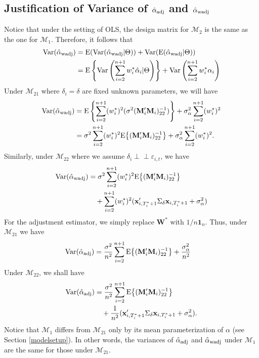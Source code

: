 \documentclass[11pt,3p,review,authoryear]{elsarticle}
\def\mbf#1{\mathbf{#1}} %
\newcommand{\indep}{\perp \!\!\! \perp } %
\def\mrm#1{\mathrm{#1}} %
\def\mc#1{\mathcal{#1}} %
\def\E#1{\mathrm{E}(#1)} %
\def\var#1{\mathrm{Var}(#1)} %
\theoremstyle{definition}
\begin{document}
\subsection{Justification of Variance of $\hat{\alpha}_{\rm adj}$ and $\hat{\alpha}_{\rm wadj}$}
\label{var}

Notice that under the setting of OLS, the design matrix for $\mc{M}_2$ is the same as the one for $\mc{M}_1$. Therefore, it follows that
  \begin{align*}
  \var{\hat{\alpha}_{\rm wadj}} 
  &= \E{\var{\hat{\alpha}_{\rm wadj}|\Theta}} + \var{\E{\hat{\alpha}_{\rm wadj}|\Theta}} \\
  &=\mrm{E} \left\{\mrm{Var}\left(\sum_{i=2}^{n+1} w_i^*\hat{\alpha}_i|\Theta\right)\right\} +\mrm{Var}\left(\sum_{i=2}^{n+1} w_i^*\alpha_i\right) 
\end{align*}
Under $\mc{M}_{21}$ where $\delta_i=\delta$ are fixed unknown parameters,  we will have
  \begin{align}
  \var{\hat{\alpha}_{\rm wadj}} 
  &= \mrm{E} \left\{\sum_{i=2}^{n+1}(w_i^*)^2(\sigma^2(\mbf{M}'_i\mbf{M}_i)^{-1}_{22})\right\} +\sigma^2_{\alpha}\sum_{i=2}^{n+1}(w_i^*)^2  \nonumber\\
  &= \sigma^2\sum_{i=2}^{n+1}(w_i^*)^2\mrm{E}\big\{(\mbf{M}'_i\mbf{M}_i)^{-1}_{22}\big\}+\sigma^2_{\alpha}\sum_{i=2}^{n+1}(w_i^*)^2.\label{equation6}
\end{align}
Similarly, under $\mc{M}_{22}$ where we assume $\delta_i \indep \varepsilon_{i,t}$, we have
 \begin{align*}
  \var{\hat{\alpha}_{\rm wadj}} 
  &= \sigma^2\sum_{i=2}^{n+1}(w_i^*)^2\mrm{E}\big\{(\mbf{M}'_i\mbf{M}_i)^{-1}_{22}\big\}\\
 & \quad  + \sum_{i=2}^{n+1} (w_i^*)^2 (\mbf{x}_{i, T_i^*+1}'\Sigma_{\delta}\mbf{x}_{i, T_i^*+1} + \sigma^2_{\alpha})
\end{align*}
For the adjustment estimator, we simply replace $\mbf{W}^*$ with $1/n\mbf{1}_n$. Thus, under $\mc{M}_{21}$ we have 
 \begin{align*}
  \var{\hat{\alpha}_{\rm adj}} 
  &=\frac{\sigma^2}{n^2}\sum_{i=2}^{n+1}\mrm{E}\big\{(\mbf{M}'_i\mbf{M}_i)^{-1}_{22}\big\}+\frac{\sigma^2_{\alpha}}{n^2}
\end{align*}
Under $\mc{M}_{22}$, we shall have
 \begin{align*}
  \var{\hat{\alpha}_{\rm adj}} 
  &=\frac{\sigma^2}{n^2}\sum_{i=2}^{n+1}\mrm{E}\big\{(\mbf{M}'_i\mbf{M}_i)^{-1}_{22}\big\}\\
  & \quad  +\frac{1}{n^2}(\mbf{x}_{i, T_i^*+1}'\Sigma_{\delta}\mbf{x}_{i, T_i^*+1} + \sigma^2_{\alpha}).
\end{align*}
Notice that $\mc{M}_{1}$ differs from $\mc{M}_{21}$ only by its mean parameterization of $\alpha$ (see Section \ref{modelsetup}). In other words, the variances of $\hat{\alpha}_{\rm adj}$ and $\hat{\alpha}_{\rm wadj}$ under $\mc{M}_1$ are the same for those under $\mc{M}_{21}$.
\end{document}
